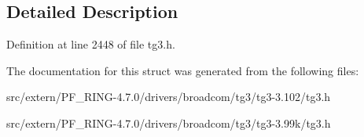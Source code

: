 \subsection{Detailed Description}


Definition at line 2448 of file tg3.h.



The documentation for this struct was generated from the following files:\begin{DoxyCompactItemize}
\item 
src/extern/PF\_\-RING-\/4.7.0/drivers/broadcom/tg3/tg3-\/3.102/tg3.h\item 
src/extern/PF\_\-RING-\/4.7.0/drivers/broadcom/tg3/tg3-\/3.99k/tg3.h\end{DoxyCompactItemize}
